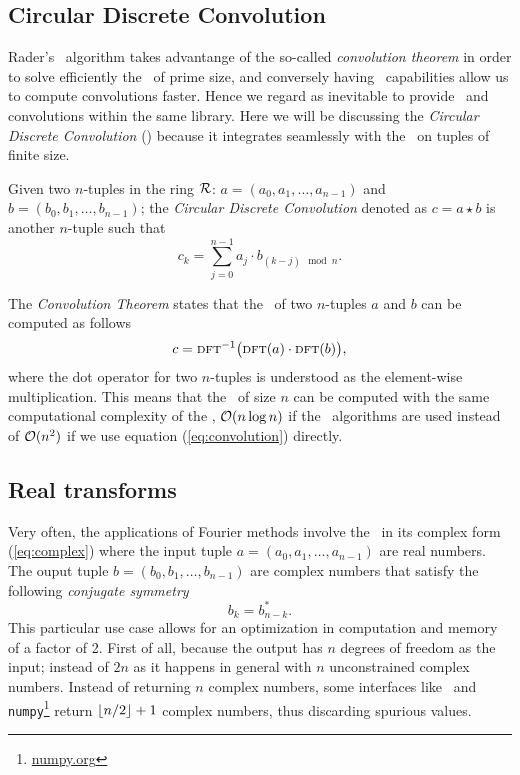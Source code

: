 \subsection{Circular Discrete Convolution}
Rader's \fft\ algorithm takes advantange of the so-called
\emph{convolution theorem} in order to solve efficiently the \dft\ of prime size, 
and conversely having \fft\ capabilities allow
us to compute convolutions faster. Hence we regard as
inevitable to provide \dft\ and convolutions within the same library.
Here we will be discussing the \emph{Circular Discrete Convolution} (\cdc)
because it integrates seamlessly with the \dft\ on tuples of finite size.
\begin{definition}
    Given two $n$-tuples in the ring $\mathcal{R}$: 
    $a = (a_0,a_1,\ldots,a_{n-1})$ and $b=(b_0,b_1,\ldots,b_{n-1})$;
    the \emph{Circular Discrete Convolution} denoted as 
    $c = a\star b$ is another
    $n$-tuple such that
    \begin{equation} 
        c_k = \sum_{j=0}^{n-1} a_j \cdot b_{(k-j) \mod n}.
        \label{eq:convolution}
    \end{equation}
    \label{def:convolution}
\end{definition}
The \emph{Convolution Theorem} states that the \cdc\ of two $n$-tuples $a$ and
$b$ can be computed as follows
\begin{equation}
    c = \textsc{dft}^{-1}\big( \textsc{dft}(a) \cdot \textsc{dft}(b)  \big),
    \label{eq:conv_theorem}
\end{equation}
where the dot operator for two $n$-tuples is understood as the element-wise
multiplication. This means that the \cdc\ of size $n$ can be computed with the
same computational complexity of the \dft, $\mathcal{O}(n\log n)$ if the \fft\
algorithms are used instead of $\mathcal{O}(n^2)$ if we use equation
(\ref{eq:convolution}) directly.

\subsection{Real transforms}\label{subsec:real}
Very often, the applications of Fourier methods involve the \dft\ in its complex
form (\ref{eq:complex}) where the input tuple $a = (a_0,a_1,\ldots,a_{n-1})$ are
real numbers.
The ouput tuple $b = (b_0,b_1,\ldots,b_{n-1})$ are complex numbers that satisfy
the following \emph{conjugate symmetry} 
\begin{equation}
    b_{k} = b^*_{n-k}.
    \label{eq:rfft_sym}
\end{equation}
This particular use case allows for an optimization in computation and memory of
a factor of 2. First of all, because the output has $n$ degrees of freedom as
the input; instead of $2n$ as it happens in general with $n$ unconstrained
complex numbers. Instead of returning $n$ complex numbers, some interfaces like
\fftw\ and \texttt{numpy}\footnote{\url{numpy.org}} return $\lfloor n/2 \rfloor+1$
complex numbers, thus discarding spurious values.

